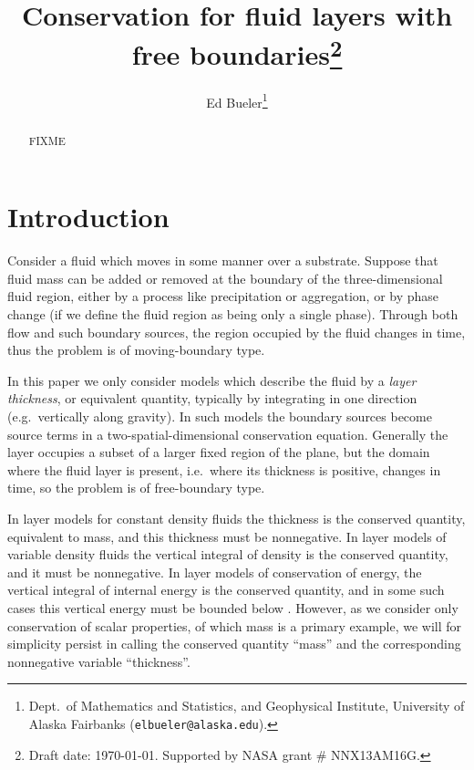 \documentclass[final,leqno,onefignum,onetabnum]{siamltex1213bueler}
\title{Conservation for fluid layers with free boundaries\thanks{Draft date: \today.  Supported by NASA grant \# NNX13AM16G.}}
\author{Ed Bueler\thanks{Dept.~of Mathematics and Statistics, and Geophysical Institute, University of Alaska Fairbanks (\texttt{elbueler@alaska.edu}).}}
\begin{document}
\maketitle
{}%

\begin{abstract}
FIXME
\end{abstract}




\pagestyle{myheadings}
\thispagestyle{plain}


\section{Introduction}  \label{sec:intro}

Consider a fluid which moves in some manner over a substrate.  Suppose that fluid mass can be added or removed at the boundary of the three-dimensional fluid region, either by a process like precipitation or aggregation, or by phase change (if we define the fluid region as being only a single phase).  Through both flow and such boundary sources, the region occupied by the fluid changes in time, thus the problem is of moving-boundary type.

In this paper we only consider models which describe the fluid by a \emph{layer thickness}, or equivalent quantity, typically by integrating in one direction (e.g.~vertically along gravity).  In such models the boundary sources become source terms in a two-spatial-dimensional conservation equation.  Generally the layer occupies a subset of a larger fixed region of the plane, but the domain where the fluid layer is present, i.e.~where its thickness is positive, changes in time, so the problem is of free-boundary type.

In layer models for constant density fluids the thickness is the conserved quantity, equivalent to mass, and this thickness must be nonnegative.  In layer models of variable density fluids the vertical integral of density is the conserved quantity, and it must be nonnegative.  In layer models of conservation of energy, the vertical integral of internal energy is the conserved quantity, and in some such cases this vertical energy must be bounded below \cite{AschwandenBuelerKhroulevBlatter}.  However, as we consider only conservation of scalar properties, of which mass is a primary example, we will for simplicity persist in calling the conserved quantity ``mass'' and the corresponding nonnegative variable ``thickness''.
\end{document}
